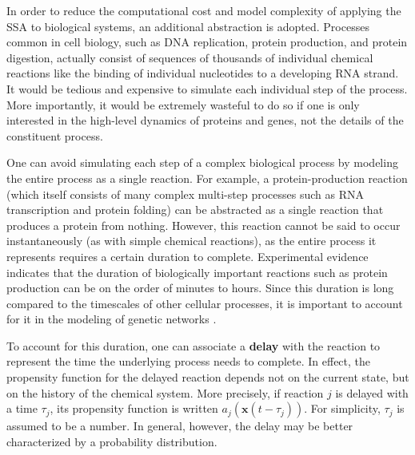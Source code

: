 \documentclass[english,letterpaper,12pt]{article}
\newcommand{\defkeywd}[1]{\textbf{#1}}
\renewcommand{\vec}[1]{\ensuremath{\mathbf{#1}}}
\newcommand{\delaytime}{\ensuremath{\tau}}
\begin{document}
\begin{doublespacing}
In order to reduce the computational cost and model complexity of applying the SSA to biological systems, an additional abstraction is adopted. Processes common in cell biology, such as DNA replication, protein production, and protein digestion, actually consist of sequences of thousands of individual chemical reactions like the binding of individual nucleotides to a developing RNA strand. It would be tedious and expensive to simulate each individual step of the process. More importantly, it would be extremely wasteful to do so if one is only interested in the high-level dynamics of proteins and genes, not the details of the constituent process.

One can avoid simulating each step of a complex biological process by modeling the entire process as a single reaction. For example, a protein-production reaction (which itself consists of many complex multi-step processes such as RNA transcription and protein folding) can be abstracted as a single reaction that produces a protein from nothing. However, this reaction cannot be said to occur instantaneously (as with simple chemical reactions), as the entire process it represents requires a certain duration to complete. Experimental evidence indicates that the duration of biologically important reactions such as protein production can be on the order of minutes to hours. Since this duration is long compared to the timescales of other cellular processes, it is important to account for it in the modeling of genetic networks \cite{delay-oscillations}.

To account for this duration, one can associate a \defkeywd{delay} with the reaction to represent the time the underlying process needs to complete. In effect, the propensity function for the delayed reaction depends not on the current state, but on the history of the chemical system. More precisely, if reaction $j$ is delayed with a time $\delaytime_j$, its propensity function is written $a_j \left(\vec{x}(t - \delaytime_j) \right)$. For simplicity, $\delaytime_j$ is assumed to be a number. In general, however, the delay may be better characterized by a probability distribution.


\end{doublespacing}
\end{document}
